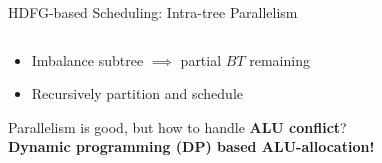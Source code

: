 \documentclass[handout]{beamer}
\begin{document}
\begin{CJK}{UTF8}{bkai}
\begin{frame}{HDFG-based Scheduling: Intra-tree Parallelism}
\begin{columns}
\begin{column}{0.6\textwidth}
\begin{itemize}
                        \item {Imbalance subtree $\implies$ partial $BT$ remaining}
                        \pause
                        \item {Recursively partition and schedule}
                        \end{itemize} 
                        \pause
                        \vspace{1em} 
                        Parallelism is good, but how to handle \textbf{ALU conflict}?\\
                        \pause
                        \vspace{1em} 
                        \centering
                        {\large{\textbf{Dynamic programming (DP) based ALU-allocation!}}}
                    \end{column}
                \end{columns}
            \end{frame}


\end{CJK}
\end{document}
